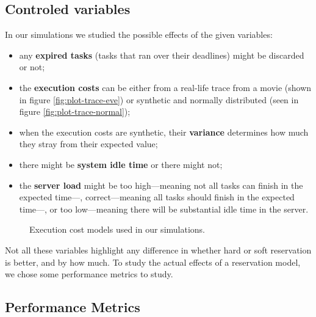 \documentclass[times, 10pt,twocolumn]{article}
\begin{document}

\subsection{Controled variables}
\label{sec:controled-variables}

In our simulations we studied the possible effects of the given
variables:
\begin{itemize}
\item any \textbf{expired tasks} (tasks that ran over their deadlines)
  might be discarded or not;
\item the \textbf{execution costs} can be either from a real-life
  trace from a movie (shown in figure \ref{fig:plot-trace-eve}) or
  synthetic and normally distributed (seen in figure
  \ref{fig:plot-trace-normal});
\item when the execution costs are synthetic, their \textbf{variance}
  determines how much they stray from their expected value;
\item there might be \textbf{system idle time} or there might not;
\item the \textbf{server load} might be too high---meaning not all
  tasks can finish in the expected time---, correct---meaning all
  tasks should finish in the expected time---, or too low---meaning
  there will be substantial idle time in the server.
\end{itemize}

\begin{figure*}[t]
  \centering
  \caption{Execution cost models used in our simulations.}
\end{figure*}

Not all these variables highlight any difference in whether hard or
soft reservation is better, and by how much. To study the actual
effects of a reservation model, we chose some performance metrics to study.

\subsection{Performance Metrics}
\label{sec:metrics}
\end{document}
